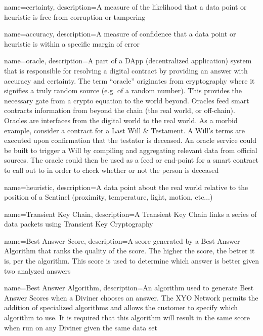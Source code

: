 \documentclass{article}
\begin{document}
{
    name={certainty},
    description={A measure of the likelihood that a data point or heuristic is free from corruption or tampering}
}

{
    name={accuracy},
    description={A measure of confidence that a data point or heuristic is within a specific margin of error}
}

{
    name={oracle},
    description={A part of a DApp (decentralized application) system that is responsible for resolving a digital contract by providing an answer with accuracy and certainty. The term ``oracle'' originates from cryptography where it signifies a truly random source (e.g. of a random number). This provides the necessary gate from a crypto equation to the world beyond. Oracles feed smart contracts information from beyond the chain (the real world, or off-chain). Oracles are interfaces from the digital world to the real world. As a morbid example, consider a contract for a Last Will \& Testament. A Will's terms are executed upon confirmation that the testator is deceased. An oracle service could be built to trigger a Will by compiling and aggregating relevant data from official sources. The oracle could then be used as a feed or end-point for a smart contract to call out to in order to check whether or not the person is deceased}
}

{
    name={heuristic},
    description={A data point about the real world relative to the position of a Sentinel (proximity, temperature, light, motion, etc...)}
}

{
    name={Transient Key Chain},
    description={A Transient Key Chain links a series of data packets using Transient Key Cryptography}
}

{
    name={Best Answer Score},
    description={A score generated by a Best Answer Algorithm that ranks the quality of the score.  The higher the score, the better it is, per the algorithm.  This score is used to determine which answer is better given two analyzed answers}
}

{
    name={Best Answer Algorithm},
    description={An algorithm used to generate Best Answer Scores when a Diviner chooses an answer.  The XYO Network permits the addition of specialized algorithms and allows the customer to specify which algorithm to use.  It is required that this algorithm will result in the same score when run on any Diviner given the same data set}
}
\end{document}
